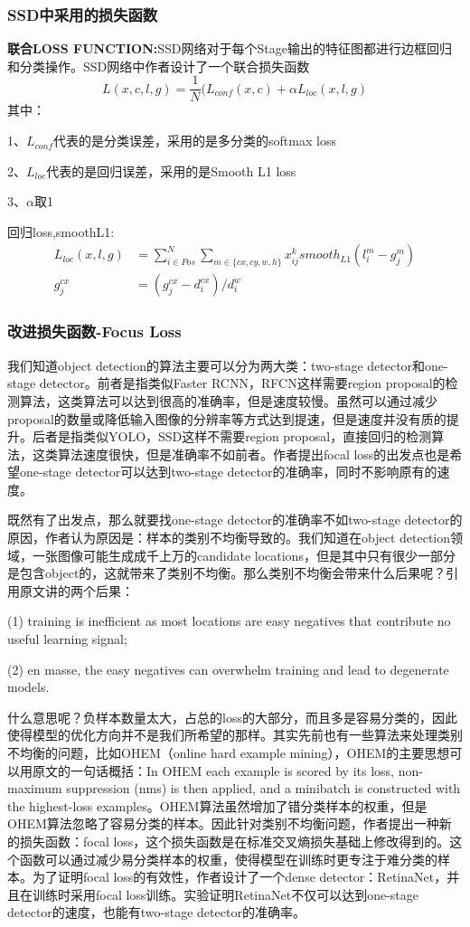 \subsubsection{SSD中采用的损失函数}
\textbf{联合LOSS FUNCTION:}SSD网络对于每个Stage输出的特征图都进行边框回归和分类操作。SSD网络中作者设计了一个联合损失函数
\[
	L(x,c,l,g) = \frac{1}{N}(L_{conf}(x,c) + \alpha L_{loc}(x,l,g)
\]
其中：

 1、$L_{conf}$代表的是分类误差，采用的是多分类的softmax loss
 
 2、$L_{loc}$代表的是回归误差，采用的是Smooth L1 loss
 
 3、$\alpha$取1
 
 回归loss,smoothL1:
\begin{align*}
 L_{loc}(x,l,g) &= \sum _{i \in Pos} ^{N} \sum_{m \in \{cx,cy,w,h\}} x_{ij}^k smooth _{L1} (l_i ^m - g_j ^m) \\
 g_j^{cx} &= \left( g_j ^{cx} - d_i ^{cx} \right) / d_i ^w 
\end{align*}

\subsubsection{改进损失函数-Focus Loss}
我们知道object detection的算法主要可以分为两大类：two-stage detector和one-stage detector。前者是指类似Faster RCNN，RFCN这样需要region proposal的检测算法，这类算法可以达到很高的准确率，但是速度较慢。虽然可以通过减少proposal的数量或降低输入图像的分辨率等方式达到提速，但是速度并没有质的提升。后者是指类似YOLO，SSD这样不需要region proposal，直接回归的检测算法，这类算法速度很快，但是准确率不如前者。作者提出focal loss的出发点也是希望one-stage detector可以达到two-stage detector的准确率，同时不影响原有的速度。

既然有了出发点，那么就要找one-stage detector的准确率不如two-stage detector的原因，作者认为原因是：样本的类别不均衡导致的。我们知道在object detection领域，一张图像可能生成成千上万的candidate locations，但是其中只有很少一部分是包含object的，这就带来了类别不均衡。那么类别不均衡会带来什么后果呢？引用原文讲的两个后果：

(1) training is inefficient as most locations are easy negatives that contribute no useful learning signal; 

(2) en masse, the easy negatives can overwhelm training and lead to degenerate models. 

什么意思呢？负样本数量太大，占总的loss的大部分，而且多是容易分类的，因此使得模型的优化方向并不是我们所希望的那样。其实先前也有一些算法来处理类别不均衡的问题，比如OHEM（online hard example mining），OHEM的主要思想可以用原文的一句话概括：In OHEM each example is scored by its loss, non-maximum suppression (nms) is then applied, and a minibatch is constructed with the highest-loss examples。OHEM算法虽然增加了错分类样本的权重，但是OHEM算法忽略了容易分类的样本。因此针对类别不均衡问题，作者提出一种新的损失函数：focal loss，这个损失函数是在标准交叉熵损失基础上修改得到的。这个函数可以通过减少易分类样本的权重，使得模型在训练时更专注于难分类的样本。为了证明focal loss的有效性，作者设计了一个dense detector：RetinaNet，并且在训练时采用focal loss训练。实验证明RetinaNet不仅可以达到one-stage detector的速度，也能有two-stage detector的准确率。

